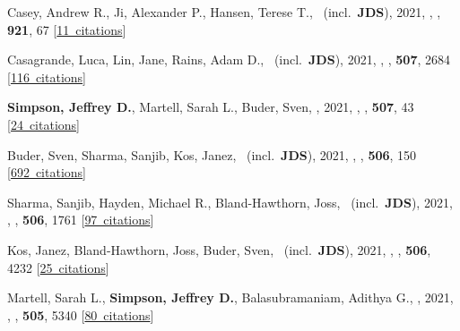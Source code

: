 \item[{\color{numcolor}\scriptsize64}] Casey, Andrew R., Ji, Alexander P., Hansen, Terese T., \etal\ (incl.\ \textbf{JDS}), 2021, , \apj, \textbf{921}, 67 [\href{https://ui.adsabs.harvard.edu/#abs/2021ApJ...921...67C}{11~citations}]

\item[{\color{numcolor}\scriptsize63}] Casagrande, Luca, Lin, Jane, Rains, Adam D., \etal\ (incl.\ \textbf{JDS}), 2021, , \mnras, \textbf{507}, 2684 [\href{https://ui.adsabs.harvard.edu/#abs/2021MNRAS.507.2684C}{116~citations}]

\item[{\color{numcolor}\scriptsize62}] \textbf{Simpson, Jeffrey D.}, Martell, Sarah L., Buder, Sven, \etal, 2021, , \mnras, \textbf{507}, 43 [\href{https://ui.adsabs.harvard.edu/#abs/2021MNRAS.507...43S}{24~citations}]

\item[{\color{numcolor}\scriptsize61}] Buder, Sven, Sharma, Sanjib, Kos, Janez, \etal\ (incl.\ \textbf{JDS}), 2021, , \mnras, \textbf{506}, 150 [\href{https://ui.adsabs.harvard.edu/#abs/2021MNRAS.506..150B}{692~citations}]

\item[{\color{numcolor}\scriptsize60}] Sharma, Sanjib, Hayden, Michael R., Bland-Hawthorn, Joss, \etal\ (incl.\ \textbf{JDS}), 2021, , \mnras, \textbf{506}, 1761 [\href{https://ui.adsabs.harvard.edu/#abs/2021MNRAS.506.1761S}{97~citations}]

\item[{\color{numcolor}\scriptsize59}] Kos, Janez, Bland-Hawthorn, Joss, Buder, Sven, \etal\ (incl.\ \textbf{JDS}), 2021, , \mnras, \textbf{506}, 4232 [\href{https://ui.adsabs.harvard.edu/#abs/2021MNRAS.506.4232K}{25~citations}]

\item[{\color{numcolor}\scriptsize58}] Martell, Sarah L., \textbf{Simpson, Jeffrey D.}, Balasubramaniam, Adithya G., \etal, 2021, , \mnras, \textbf{505}, 5340 [\href{https://ui.adsabs.harvard.edu/#abs/2021MNRAS.505.5340M}{80~citations}]

